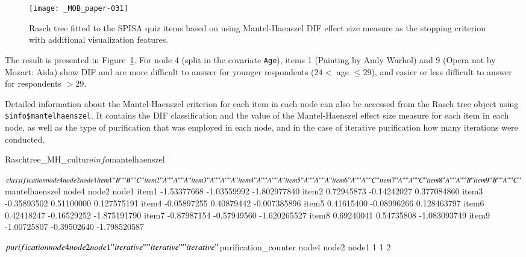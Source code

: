 \documentclass[doc,floatsintext,natbib]{apa7}
\begin{document}
\begin{figure}%
\caption{Rasch tree fitted to the SPISA quiz items based on using Mantel-Haenszel DIF effect size measure as the stopping criterion with additional visualization features.}
\texttt{[image: \_MOB\_paper-031]}
\label{fig:MHtree4}
\end{figure}%

The result is presented in Figure~\ref{fig:MHtree4}. For node 4 (split in the covariate \texttt{Age}), items 1 (Painting by Andy Warhol) and 9 (Opera not by Mozart: Aida) show DIF and are %
more difficult to answer for younger respondents ($24 <$ age $\leq 29$), and easier or less difficult to answer for respondents $>29$.

Detailed information about the Mantel-Haenszel criterion for each item in each node can also be accessed from the Rasch tree object using \texttt{\$info\$mantelhaenszel}. It contains the DIF classification and the value of the Mantel-Haenszel effect size measure for each item in each node, as well as the type of purification that was employed in each node, and in the case of iterative purification how many iterations were conducted.

\begin{Schunk}
\begin{Sinput}
 Raschtree_MH_culture$info$mantelhaenszel
\end{Sinput}
\begin{Soutput}
$classification
      node4 node2 node1
item1 "B"   "B"   "C"  
item2 "A"   "A"   "A"  
item3 "A"   "A"   "A"  
item4 "A"   "A"   "A"  
item5 "A"   "A"   "A"  
item6 "A"   "A"   "C"  
item7 "A"   "A"   "C"  
item8 "A"   "A"   "B"  
item9 "B"   "A"   "C"  

$mantelhaenszel
            node4       node2        node1
item1 -1.53377668 -1.03559992 -1.802977840
item2  0.72945873 -0.14242027  0.377084860
item3 -0.35893502  0.51100000  0.127575191
item4 -0.05897255  0.40879442 -0.007385896
item5  0.41615400 -0.08996266  0.128463797
item6  0.42418247 -0.16529252 -1.875191790
item7 -0.87987154 -0.57949560 -1.620265527
item8  0.69240041  0.54735808 -1.083093749
item9 -1.00725807 -0.39502640 -1.798520587

$purification
      node4       node2       node1 
"iterative" "iterative" "iterative" 

$purification_counter
node4 node2 node1 
    1     1     2 
\end{Soutput}
\end{Schunk}
\end{document}
